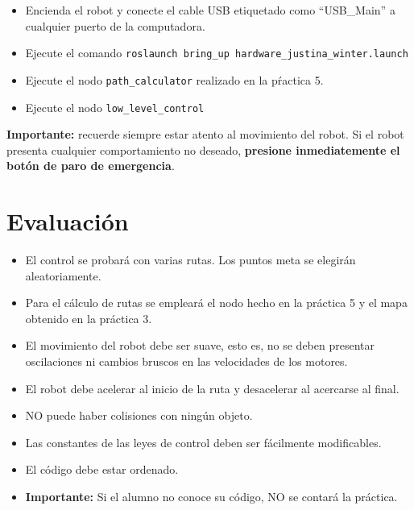 \documentclass[letterpaper,12pt]{article}
\begin{document}
\begin{itemize}
\item Encienda el robot y conecte el cable USB etiquetado como ``USB\_Main'' a cualquier puerto de la computadora.
\item Ejecute el comando \texttt{roslaunch bring\_up hardware\_justina\_winter.launch}
\item Ejecute el nodo \texttt{path\_calculator} realizado en la pŕactica 5.
\item Ejecute el nodo \texttt{low\_level\_control}
\end{itemize}

\textbf{Importante:} recuerde siempre estar atento al movimiento del robot. Si el robot presenta cualquier comportamiento no deseado, \textbf{presione inmediatemente el botón de paro de emergencia}.

\section{Evaluación}
\begin{itemize}
\item El control se probará con varias rutas. Los puntos meta se elegirán aleatoriamente.
\item Para el cálculo de rutas se empleará el nodo hecho en la práctica 5 y el mapa obtenido en la práctica 3.
\item El movimiento del robot debe ser suave, esto es, no se deben presentar oscilaciones ni cambios bruscos en las velocidades de los motores.
\item El robot debe acelerar al inicio de la ruta y desacelerar al acercarse al final.
\item NO puede haber colisiones con ningún objeto. 
\item Las constantes de las leyes de control deben ser fácilmente modificables. 
\item El código debe estar ordenado.
\item \textbf{Importante: } Si el alumno no conoce su código, NO se contará la práctica.
\end{itemize}
\end{document}
